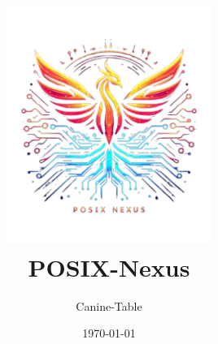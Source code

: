 \documentclass[../posix-nexus.tex]{subfiles}
\begin{document}
    \title{
        \includegraphics[width=0.5\textwidth]{setup/images/posix-nexus-icon.png}\\[1cm]
        \textbf{POSIX-Nexus}
    }

    \author{Canine-Table}
    \date{\today}
    \maketitle
\end{document}
